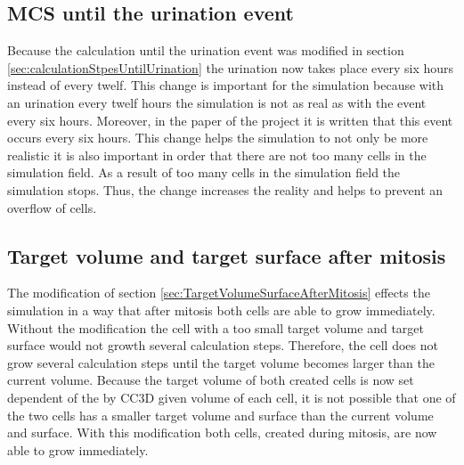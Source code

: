 \subsection{\ac{MCS} until the urination event}
Because the calculation until the urination event was modified in section \ref{sec:calculationStpesUntilUrination} the urination now takes place every six hours instead of every twelf. This change is important for the simulation because with an urination every twelf hours the simulation is not as real as with the event every six hours. Moreover, in the paper \cite{Torelli2017} of the project it is written that this event occurs every six hours. This change helps the simulation to not only be more realistic it is also important in order that there are not too many cells in the simulation field. As a result of too many cells in the simulation field the simulation stops. Thus, the change increases the reality and helps to prevent an overflow of cells.
\subsection{Target volume and target surface after mitosis}
The modification of section \ref{sec:TargetVolumeSurfaceAfterMitosis} effects the simulation in a way that after mitosis both cells are able to grow immediately. Without the modification the cell with a too small target volume and target surface would not growth several calculation steps. Therefore, the cell does not grow several calculation steps until the target volume becomes larger than the current volume. Because the target volume of both created cells is now set dependent of the by \ac{CC3D} given volume of each cell, it is not possible that one of the two cells has a smaller target volume and surface than the current volume and surface. With this modification both cells, created during mitosis, are now able to grow immediately.
